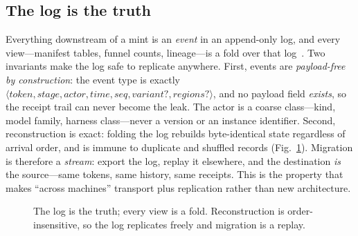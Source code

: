 \documentclass[10pt,twocolumn]{article}
\begin{document}
\subsection{The log is the truth}
Everything downstream of a mint is an \emph{event} in an append-only log,
and every view---manifest tables, funnel counts, lineage---is a fold over
that log~\citep{kreps2013}. Two invariants make the log safe to replicate
anywhere. First, events are \emph{payload-free by construction}: the event
type is exactly $\langle \textit{token}, \textit{stage}, \textit{actor},
\textit{time}, \textit{seq}, \textit{variant?}, \textit{regions?}\rangle$,
and no payload field \emph{exists}, so the receipt trail can never become
the leak. The actor is a coarse class---kind, model family, harness
class---never a version or an instance identifier. Second, reconstruction
is exact: folding the log rebuilds byte-identical state regardless of
arrival order, and is immune to duplicate and shuffled records
(Fig.~\ref{fig:log}). Migration is therefore a \emph{stream}: export the
log, replay it elsewhere, and the destination \emph{is} the source---same
tokens, same history, same receipts. This is the property that makes
``across machines'' transport plus replication rather than new
architecture.

\begin{figure}[t]
\centering
{}
\caption{The log is the truth; every view is a fold. Reconstruction is
order-insensitive, so the log replicates freely and migration is a
replay.}
\label{fig:log}
\end{figure}
\end{document}
